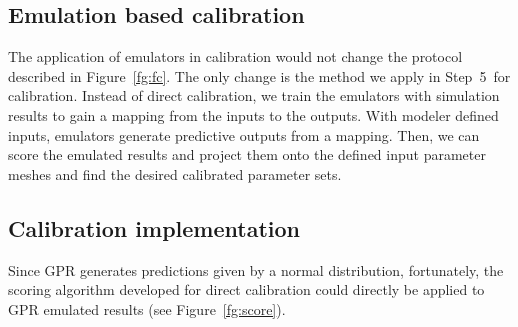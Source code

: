 \documentclass[review]{elsarticle}
\begin{document}
%
\subsection{Emulation based calibration}
The application of emulators in calibration would not change the protocol described in Figure~\ref{fg:fc}. The only change is the method we apply in Step~5~for calibration. Instead of direct calibration, we train the emulators with simulation results to gain a mapping from the inputs to the outputs. With modeler defined inputs, emulators generate predictive outputs from a mapping. Then, we can score the emulated results and project them onto the defined input parameter meshes and find the desired calibrated parameter sets.
\subsection{Calibration implementation}
Since GPR generates predictions given by a normal distribution, fortunately, the scoring algorithm developed for direct calibration could directly be applied to GPR emulated results (see Figure~\ref{fg:score}).
\end{document}
